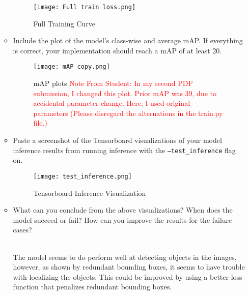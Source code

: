 \documentclass[11pt,addpoints,answers]{exam}
\numberwithin{equation}{section} %
\numberwithin{figure}{section} %
\numberwithin{table}{section} %
\newcommand{\red}[1]{\textcolor{red}{#1}}
\begin{document}
\begin{itemize}
\begin{itemize}
        \begin{figure}[H]
            \centering
            \texttt{[image: Full train loss.png]}
            \caption{Full Training Curve}
            \label{fig:full_loss_plot}
        \end{figure}

        \item Include the plot of the model's class-wise and average mAP. If everything is correct, your implementation should reach a mAP of at least 20.

        \begin{figure}[H]
            \centering
            \texttt{[image: mAP copy.png]}
            \caption{mAP plots \red{Note From Student: In my second PDF submission, I changed this plot.
            Prior mAP was 39, due to accidental parameter change. 
            Here, I used original parameters
            (Please disregard the alternations in the train.py file.)}}
            \label{fig:final_mAP}
        \end{figure}
        
        \item Paste a screenshot of the Tensorboard visualizations of your model inference results from running inference with the \texttt{--test\_inference} flag on.

        \begin{figure}[H]
            \centering
            \texttt{[image: test\_inference.png]}
            \caption{Tensorboard Inference Visualization}
            \label{fig:inference_results}
        \end{figure}

        \item What can you conclude from the above visualizations? When does the model succeed or fail? How can you improve the results for the failure cases?
        
        \begin{solution}
        \\ The model seems to do perform well at detecting objects in the images, however, as shown by redundant bounding boxes,
        it seems to have trouble with localizing the objects. 
        This could be improved by using a better loss function that penalizes redundant bounding boxes.
        \end{solution}

    \end{itemize}
\end{itemize}
\end{document}
